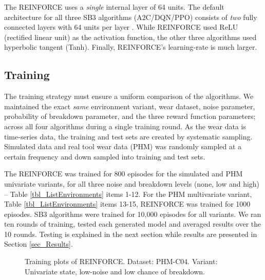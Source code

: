 \documentclass[referee, sn-mathphys-num]{sn-jnl}
\begin{document}
	The REINFORCE uses a \textit{single} internal layer of 64 units. The default architecture for all three SB3 algorithms (A2C/DQN/PPO) consists of \textit{two} fully connected layers with 64 units per layer \cite{SB3-DefaultNetwork}. While REINFORCE used ReLU (rectified linear unit) as the activation function, the other three algorithms used hyperbolic tangent (Tanh). Finally, REINFORCE's learning-rate is much larger.
	
	
	\subsection{Training}
	The training strategy must ensure a uniform comparison of the algorithms. We maintained the exact \textit{same} environment variant, wear dataset, noise parameter, probability of breakdown parameter, and the three reward function parameters; across all four algorithms during a single training round. %
	As the wear data is time-series data, the training and test sets are created by systematic sampling. Simulated data and real tool wear data (PHM) was randomly sampled at a certain frequency and down sampled into training and test sets.
	
	The REINFORCE was trained for 800 episodes for the simulated and PHM univariate variants, for all three noise and breakdown levels (none, low and high) -- Table \ref{tbl_ListEnvironments} items 1-12. For the PHM multivariate variant, Table \ref{tbl_ListEnvironments} items 13-15, REINFORCE was trained for 1000 episodes. SB3 algorithms were trained for 10,000 episodes for all variants. We ran ten rounds of training, tested each generated model and averaged results over the 10 rounds. Testing is explained in the next section while results are presented in Section \ref{sec_Results}.
	
	\begin{figure}
		\centering	
		\hfill
		\caption{Training plots of REINFORCE. Dataset: PHM-C04. Variant: Univariate state, low-noise and low chance of breakdown.}
		\label{fig_C04trplots}
	\end{figure}
	
\end{document}
